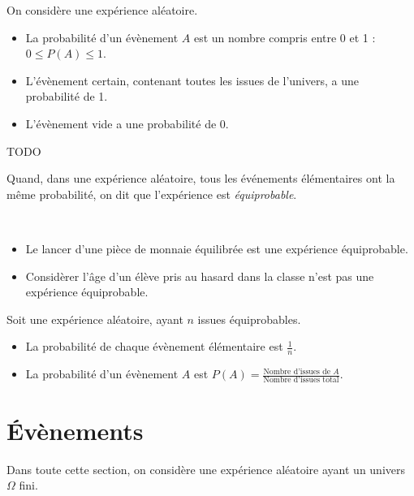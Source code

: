\begin{propriete}On considère une expérience aléatoire.
  \begin{itemize}
    \item La probabilité d'un évènement $A$ est un nombre compris entre 0 et 1 : $0\leq P(A)\leq1$.
    \item L'évènement certain, contenant toutes les issues de l'univers, a une probabilité de 1.
    \item L'évènement vide a une probabilité de 0.
  \end{itemize}
\end{propriete}

\begin{exemple}
  TODO
\end{exemple}

\begin{definition}
  Quand, dans une expérience aléatoire, tous les événements élémentaires ont la même
  probabilité, on dit que l'expérience est \emph{équiprobable}.
\end{definition}
\begin{exemple}~
  \begin{itemize}
    \item Le lancer d'une pièce de monnaie équilibrée est une expérience équiprobable.
    \item Considèrer l'âge d'un élève pris au hasard dans la classe n'est pas une expérience équiprobable.
  \end{itemize}
\end{exemple}

\begin{propriete}
  Soit une expérience aléatoire, ayant $n$ issues équiprobables.
  \begin{itemize}
    \item La probabilité de chaque évènement élémentaire est $\frac{1}{n}$.
    \item La probabilité d'un évènement $A$ est $P(A)=\frac{\text{Nombre
      d'issues de $A$}}{\text{Nombre d'issues total}}$.
  \end{itemize}
\end{propriete}

\section{Évènements}

\begin{em}
\noindent Dans toute cette section, on considère une expérience aléatoire ayant un
  univers $\Omega$ fini.
\end{em}

